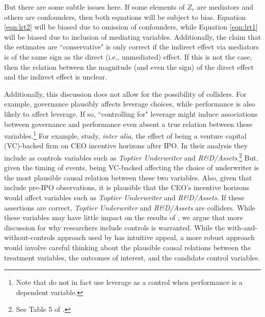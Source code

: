 \documentclass[11pt,reqno,titlepage]{amsart}
\begin{document}
\begin{doublespace}
But there are some subtle issues here.
If some elements of $Z_r$ are mediators and others are confounders, then both equations will be subject to bias. 
Equation \ref{eqn:lrt2} will be biased due to omission of confounders, while Equation \ref{eqn:lrt1}  will be biased due to inclusion of mediating variables.
Additionally, the claim that the estimates are ``conservative" is only correct if the indirect effect via mediators is of the same sign as the direct (i.e., unmediated) effect. 
If this is not the case, then the relation between the magnitude (and even the sign) of the direct effect and the indirect effect is unclear.

Additionally, this discussion does not allow for the possibility of colliders.
For example, governance plausibly affects leverage choices, while performance is also likely to affect leverage.
If so, ``controlling for" leverage might induce associations between governance and performance even absent a true relation between these variables.\footnote{
Note that \citet{Larcker:2007aa} do not in fact use leverage as a control when performance is a dependent variable.}
For example, \citet{Cadman:2014cr} study, \emph{inter alia}, the effect of being a venture capital (VC)-backed firm on CEO incentive horizons after IPO.
In their analysis they include as controls variables such as \emph{Toptier Underwriter} and \emph{R\&D/Assets}.\footnote{See Table 5 of \citet{Cadman:2014cr}.}
But, given the timing of events, being VC-backed affecting the choice of underwriter is the most plausible causal relation between these two variables.
Also, given that \citet{Cadman:2014cr} include pre-IPO observations, it is plausible that the CEO's incentive horizons would affect variables such as \emph{Toptier Underwriter} and \emph{R\&D/Assets}.
If these assertions are correct,  \emph{Toptier Underwriter} and \emph{R\&D/Assets} are colliders.
While these variables may have little impact on the results of \citet{Cadman:2014cr}, we argue that more discussion for why researchers include controls is warranted.
While the with-and-without-controls approach used by \citet{Larcker:2007aa} has intuitive appeal, a more robust approach would involve careful thinking about the plausible causal relations between the treatment variables, the outcomes of interest, and the candidate control variables.


\end{doublespace}
\end{document}
